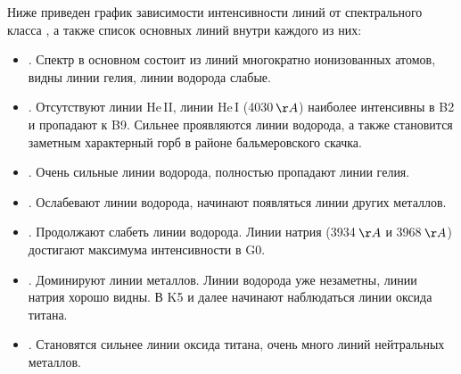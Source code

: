 Ниже приведен график зависимости интенсивности линий от спектрального класса , а также список основных линий внутри каждого из них:

\begin{itemize}
	\item {}. Спектр в основном состоит из линий  многократно ионизованных атомов, видны линии гелия, линии водорода слабые.
	\item {}. Отсутствуют линии He$\,$II, линии He$\,$I (4030$\,\AA$) наиболее интенсивны в B2 и пропадают к B9. Сильнее проявляются линии водорода, а также становится заметным характерный горб в районе бальмеровского скачка.
	\item {}. Очень сильные линии водорода, полностью пропадают линии гелия.
	\item {}. Ослабевают линии водорода, начинают появляться линии других металлов. 
	\item {}. Продолжают слабеть линии водорода. Линии натрия (3934$\,\AA$ и 3968$\,\AA$) достигают максимума интенсивности в G0.
	\item {}. Доминируют линии металлов. Линии водорода уже незаметны, линии натрия хорошо видны. В K5 и далее начинают наблюдаться линии оксида титана.
	\item {}. Становятся сильнее линии оксида титана, очень много линий нейтральных металлов.
\end{itemize}

